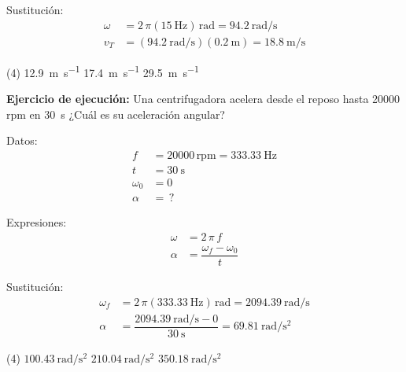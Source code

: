 \documentclass[12pt, letter]{exam}
\begin{document}
\begin{questions}
    Sustitución:
    \begin{align*}
    \omega &= 2 \, \pi (\SI{15}{\hertz}) \, \unit{\radian} = \SI{94.2}{\radian\per\second} \\
    v_{T} &= \left( \SI{94.2}{\radian\per\second} \right) (\SI{0.2}{\meter}) = \SI{18.8}{\meter\per\second}
    \end{align*}

    \vspace{0.3cm}
    \begin{tasks}(4)
        \task \SI{12.9}{\meter\per\second}
        \task \SI{17.4}{\meter\per\second}
        \task {}
        \task \SI{29.5}{\meter\per\second}
    \end{tasks}
    \question \label{Ejercicio_03} \textbf{Ejercicio de ejecución: } Una centrifugadora acelera desde el reposo hasta \num{20000} rpm en \SI{30}{\second} ¿Cuál es su aceleración angular?

    \begin{minipage}[t]{0.4\linewidth}
    Datos: 
    \begin{align*}
    f &= 20000 \, \text{rpm} = \SI{333.33}{\hertz} \\
    t &= \SI{30}{\second} \\
    \omega_{0} &= 0 \\
    \alpha &= \, ?
    \end{align*}
    \end{minipage}
    \hspace{1cm}
    \begin{minipage}[t]{0.4\linewidth}
    Expresiones:
    \begin{align*}
    \omega &= 2 \, \pi \, f \\
    \alpha &= \dfrac{\omega_{f} - \omega_{0}}{t}
    \end{align*}
    \end{minipage}

    Sustitución:
    \begin{align*}
    \omega_{f} &= 2 \, \pi (\SI{333.33}{\hertz}) \, \unit{\radian} = \SI[per-mode=fraction]{2094.39}{\radian\per\second} \\[0.5em]
    \alpha &= \dfrac{ \SI{2094.39}{\radian\per\second} - 0 }{\SI{30}{\second}} = \SI[per-mode=fraction]{69.81}{\radian\per\square\second}
    \end{align*}

    \vspace{0.3cm}
    \begin{tasks}(4)
        \task {}
        \task $\displaystyle \SI[per-mode=fraction]{100.43}{\radian\per\square\second}$
        \task $\displaystyle \SI[per-mode=fraction]{210.04}{\radian\per\square\second}$
        \task $\displaystyle \SI[per-mode=fraction]{350.18}{\radian\per\square\second}$
    \end{tasks}


\end{questions}
\end{document}
